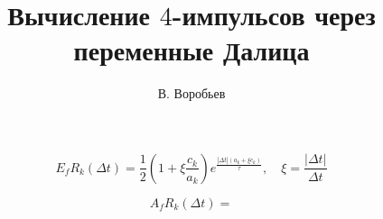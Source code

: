 \documentclass[a4paper,12pt]{article}
\title{Вычисление $4$-импульсов через переменные Далица}
\author{В. Воробьев}
\begin{document}
\maketitle

\begin{equation}
 E_fR_k(\Delta t) = \frac{1}{2}\left(1+\xi\frac{c_k}{a_k}\right)e^{\frac{|\Delta t|\left(a_k+\xi c_k\right)}{\tau}}, \quad \xi = \frac{|\Delta t|}{\Delta t}
\end{equation}

\begin{equation}
 A_fR_k(\Delta t) = 
\end{equation}
\end{document}
